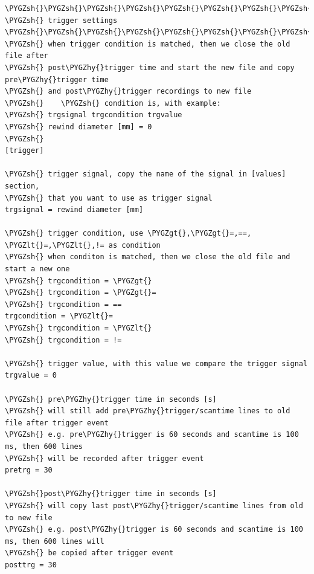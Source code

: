 \documentclass[a4paper,10pt,english]{sphinxmanual}
\def\PYGZlt{\char`\<}
\def\PYGZgt{\char`\>}
\def\PYGZsh{\char`\#}
\def\PYGZhy{\char`\-}
\begin{document}
\begin{Verbatim}[commandchars=\\\{\}]
\PYGZsh{}\PYGZsh{}\PYGZsh{}\PYGZsh{}\PYGZsh{}\PYGZsh{}\PYGZsh{}\PYGZsh{}\PYGZsh{}\PYGZsh{}\PYGZsh{}\PYGZsh{}\PYGZsh{}\PYGZsh{}\PYGZsh{}\PYGZsh{}\PYGZsh{}\PYGZsh{}\PYGZsh{}\PYGZsh{}\PYGZsh{}\PYGZsh{}\PYGZsh{}\PYGZsh{}\PYGZsh{}\PYGZsh{}\PYGZsh{}\PYGZsh{}\PYGZsh{}\PYGZsh{}\PYGZsh{}\PYGZsh{}\PYGZsh{}\PYGZsh{}\PYGZsh{}\PYGZsh{}\PYGZsh{}\PYGZsh{}\PYGZsh{}\PYGZsh{}\PYGZsh{}\PYGZsh{}\PYGZsh{}\PYGZsh{}\PYGZsh{}\PYGZsh{}\PYGZsh{}\PYGZsh{}\PYGZsh{}\PYGZsh{}\PYGZsh{}\PYGZsh{}\PYGZsh{}\PYGZsh{}\PYGZsh{}\PYGZsh{}\PYGZsh{}\PYGZsh{}\PYGZsh{}\PYGZsh{}\PYGZsh{}\PYGZsh{}\PYGZsh{}\PYGZsh{}\PYGZsh{}\PYGZsh{}\PYGZsh{}\PYGZsh{}\PYGZsh{}\PYGZsh{}\PYGZsh{}\PYGZsh{}
\PYGZsh{} trigger settings
\PYGZsh{}\PYGZsh{}\PYGZsh{}\PYGZsh{}\PYGZsh{}\PYGZsh{}\PYGZsh{}\PYGZsh{}\PYGZsh{}\PYGZsh{}\PYGZsh{}\PYGZsh{}\PYGZsh{}\PYGZsh{}\PYGZsh{}\PYGZsh{}\PYGZsh{}\PYGZsh{}\PYGZsh{}\PYGZsh{}\PYGZsh{}\PYGZsh{}\PYGZsh{}\PYGZsh{}\PYGZsh{}\PYGZsh{}\PYGZsh{}\PYGZsh{}\PYGZsh{}\PYGZsh{}\PYGZsh{}\PYGZsh{}\PYGZsh{}\PYGZsh{}\PYGZsh{}\PYGZsh{}\PYGZsh{}\PYGZsh{}\PYGZsh{}\PYGZsh{}\PYGZsh{}\PYGZsh{}\PYGZsh{}\PYGZsh{}\PYGZsh{}\PYGZsh{}\PYGZsh{}\PYGZsh{}\PYGZsh{}\PYGZsh{}\PYGZsh{}\PYGZsh{}\PYGZsh{}\PYGZsh{}\PYGZsh{}\PYGZsh{}\PYGZsh{}\PYGZsh{}\PYGZsh{}\PYGZsh{}\PYGZsh{}\PYGZsh{}\PYGZsh{}\PYGZsh{}\PYGZsh{}\PYGZsh{}\PYGZsh{}\PYGZsh{}\PYGZsh{}\PYGZsh{}\PYGZsh{}\PYGZsh{}
\PYGZsh{} when trigger condition is matched, then we close the old file after
\PYGZsh{} post\PYGZhy{}trigger time and start the new file and copy pre\PYGZhy{}trigger time
\PYGZsh{} and post\PYGZhy{}trigger recordings to new file
\PYGZsh{}    \PYGZsh{} condition is, with example:
\PYGZsh{} trgsignal trgcondition trgvalue
\PYGZsh{} rewind diameter [mm] = 0
\PYGZsh{}
[trigger]

\PYGZsh{} trigger signal, copy the name of the signal in [values] section,
\PYGZsh{} that you want to use as trigger signal
trgsignal = rewind diameter [mm]

\PYGZsh{} trigger condition, use \PYGZgt{},\PYGZgt{}=,==, \PYGZlt{}=,\PYGZlt{},!= as condition
\PYGZsh{} when conditon is matched, then we close the old file and start a new one
\PYGZsh{} trgcondition = \PYGZgt{}
\PYGZsh{} trgcondition = \PYGZgt{}=
\PYGZsh{} trgcondition = ==
trgcondition = \PYGZlt{}=
\PYGZsh{} trgcondition = \PYGZlt{}
\PYGZsh{} trgcondition = !=

\PYGZsh{} trigger value, with this value we compare the trigger signal
trgvalue = 0

\PYGZsh{} pre\PYGZhy{}trigger time in seconds [s]
\PYGZsh{} will still add pre\PYGZhy{}trigger/scantime lines to old file after trigger event
\PYGZsh{} e.g. pre\PYGZhy{}trigger is 60 seconds and scantime is 100 ms, then 600 lines
\PYGZsh{} will be recorded after trigger event
pretrg = 30

\PYGZsh{}post\PYGZhy{}trigger time in seconds [s]
\PYGZsh{} will copy last post\PYGZhy{}trigger/scantime lines from old to new file
\PYGZsh{} e.g. post\PYGZhy{}trigger is 60 seconds and scantime is 100 ms, then 600 lines will
\PYGZsh{} be copied after trigger event
posttrg = 30
\end{Verbatim}
\end{document}

